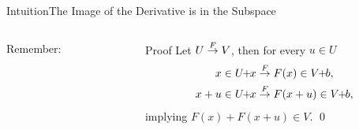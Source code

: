 \begin{frame}{Intuition}{The Image of the Derivative is in the Subspace}
\begin{columns}
\begin{column}{0.475\textwidth}
\begin{block}{Remember:}
            \end{block}
        \end{column}
        \begin{column}{0.475\textwidth}
            \begin{block}{Proof}
                \vspace{0.5em}
                Let $U \stackrel{F}{\rightarrow} V$, then for every $u \in U$
                \begin{align*}
                    x \in \coset{U}{x} &\through{F} F(x) \in \coset{V}{b}, \\
                    x+u \in \coset{U}{x} &\through{F} F(x+u) \in \coset{V}{b},
                \end{align*}
                implying $F(x) + F(x + u) \in V$.
                \qed{}
                \vspace{0.5em}
            \end{block}
        \end{column}
    \end{columns}
\end{frame}

